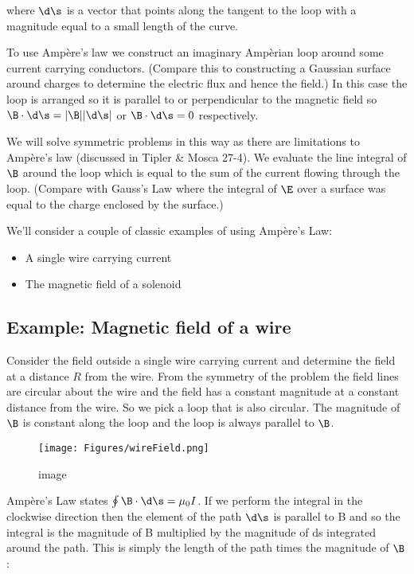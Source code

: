 \documentclass[
]{book}
\theoremstyle{definition}
\theoremstyle{definition}
\theoremstyle{definition}
\theoremstyle{definition}
\theoremstyle{remark}
\begin{document}
where \(\d\s\) is a vector that points along the tangent to the loop with
a magnitude equal to a small length of the curve.

To use Ampère's law we construct an imaginary Ampèrian loop around some
current carrying conductors. (Compare this to constructing a Gaussian
surface around charges to determine the electric flux and hence the
field.) In this case the loop is arranged so it is parallel to or
perpendicular to the magnetic field so \(\B \cdot \d\s =|\B||\d\s|\) or
\(\B\cdot \d\s = 0\) respectively.

We will solve symmetric problems in this way as there are limitations to
Ampère's law (discussed in Tipler \& Mosca 27-4). We evaluate the line
integral of \(\B\) around the loop which is equal to the sum of the
current flowing through the loop. (Compare with Gauss's Law where the
integral of \(\E\) over a surface was equal to the charge enclosed by the
surface.)

We'll consider a couple of classic examples of using Ampère's Law:

\begin{itemize}
\item
  A single wire carrying current
\item
  The magnetic field of a solenoid
\end{itemize}

\hypertarget{example-magnetic-field-of-a-wire}{%
\subsection{Example: Magnetic field of a wire}\label{example-magnetic-field-of-a-wire}}

Consider the field outside a single wire carrying current and determine
the field at a distance \(R\) from the wire. From the symmetry of the
problem the field lines are circular about the wire and the field has a
constant magnitude at a constant distance from the wire. So we pick a
loop that is also circular. The magnitude of \(\B\) is constant along the
loop and the loop is always parallel to \(\B\).

\begin{figure}
\centering
\texttt{[image: Figures/wireField.png]}
\caption{image}
\end{figure}

Ampère's Law states \(\oint \B \cdot \d\s = \mu_0 I\). If we perform the
integral in the clockwise direction then the element of the path \(\d\s\)
is parallel to B and so the integral is the magnitude of B multiplied by
the magnitude of ds integrated around the path. This is simply the
length of the path times the magnitude of \(\B\):
\end{document}
